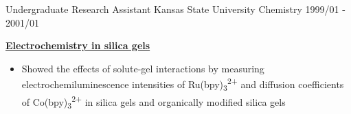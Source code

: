 \begin{cventries}
  \cventry
    {Undergraduate Research Assistant} %
    {Kansas State University} %
    {Chemistry} %
    {1999/01 - 2001/01} %
    {
      \begin{cvitems} %
        \item {\textbf{\underline{Electrochemistry in silica gels}}}
            \begin{itemize}
                \item {Showed the effects of solute-gel interactions by measuring electrochemiluminescence intensities of Ru(bpy)\textsubscript{3}\textsuperscript{2+} and diffusion coefficients of Co(bpy)\textsubscript{3}\textsuperscript{2+} in silica gels and organically modified silica gels}
            \end{itemize}
      \end{cvitems}
    }
    
\end{cventries}
